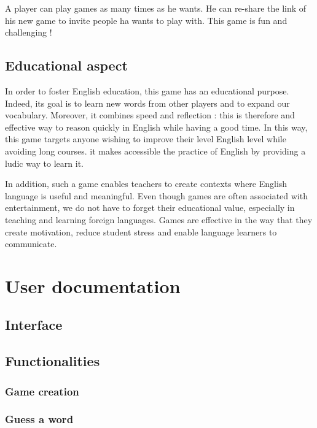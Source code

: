 \documentclass{tnreport}
\begin{document}
A player can play games as many times as he wants. He can re-share the link of his new game to invite people ha wants to play with. This game is fun and challenging !

\section{Educational aspect}

In order to foster English education, this game has an educational purpose. Indeed, its goal is to learn new words from other players and to expand our vocabulary. Moreover, it combines speed and reflection : this is therefore and effective way to reason quickly in English while having a good time. In this way, this game targets anyone wishing to improve their level English level while avoiding long courses. it makes accessible the practice of English by providing a ludic way to learn it. 

In addition, such a game enables teachers to create contexts where English language is useful and meaningful. Even though games are often associated with entertainment, we do not have to forget their educational value, especially in teaching and learning foreign languages. Games are effective in the way that they create motivation, reduce student stress and enable language learners to communicate.

\cleardoublepage

\chapter{User documentation}

\section{Interface}

\section{Functionalities}

\subsection{Game creation}

\subsection{Guess a word}
\end{document}

